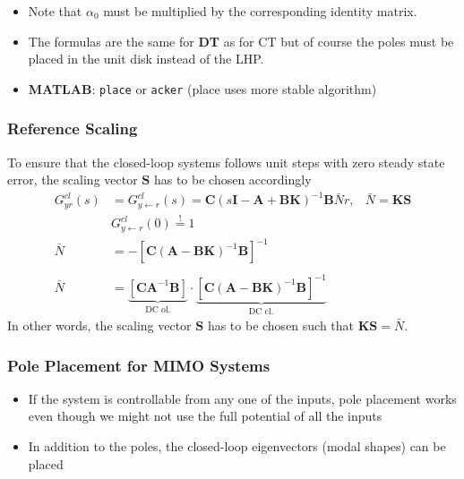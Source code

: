 \newpar{}

\begin{itemize}
    \item Note that $\alpha_0$ must be multiplied by the corresponding identity matrix.
    \item The formulas are the same for \textbf{DT} as for CT but of course the poles must be placed in the unit disk instead of the LHP.
    \item \textbf{MATLAB}: \texttt{place} or \texttt{acker} (place uses more stable algorithm)
\end{itemize}

\subsubsection{Reference Scaling}
To ensure that the closed-loop systems follows unit steps with zero steady state error, the scaling vector $\mathbf{S}$ has to be chosen accordingly
\noindent\begin{align*}
    G_{yr}^{cl}(s) & = G_{y\leftarrow r}^{cl}(s) =\mathbf{C}{(s\mathbf{I}-\mathbf{A}+\mathbf{BK})}^{-1}\mathbf{B}\bar{N}r,                                                                          & \bar{N}=\mathbf{KS} \\
                   & G_{y\leftarrow r}^{cl}(0)  \overset{!}{=} 1                                                                                                                                                          \\
    \bar{N}        & =-{\left[\mathbf{C}{(\mathbf{A}-\mathbf{BK})}^{-1}\mathbf{B}\right]}^{-1}                                                                                                                            \\\\
    \bar{N}        & =\underbrace{\left[\mathbf{CA}^{-1}\mathbf{B}\right]}_{\text{DC ol.}}\cdot\underbrace{{\left[\mathbf{C}{(\mathbf{A}-\mathbf{BK})}^{-1}\mathbf{B}\right]}^{-1}}_{\text{DC cl.}}
\end{align*}
In other words, the scaling vector $\mathbf{S}$ has to be chosen such that $\mathbf{KS}=\bar{N}$.

\subsubsection{Pole Placement for MIMO Systems}
\begin{itemize}
    \item If the system is controllable from any one of the inputs, pole placement works even though we might not use the full potential of all the inputs
    \item In addition to the poles, the closed-loop eigenvectors (modal shapes) can be placed
\end{itemize}
